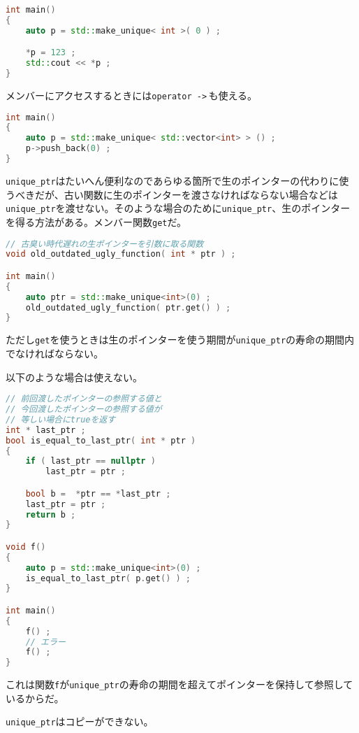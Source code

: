 \begin{lstlisting}[language={C++}]
int main()
{
    auto p = std::make_unique< int >( 0 ) ;

    *p = 123 ;
    std::cout << *p ;
}
\end{lstlisting}

メンバーにアクセスするときには\texttt{operator ->}\,も使える。

\begin{lstlisting}[language={C++}]
int main()
{
    auto p = std::make_unique< std::vector<int> > () ;
    p->push_back(0) ;
}
\end{lstlisting}

\texttt{unique\_ptr}はたいへん便利なのであらゆる箇所で生のポインターの代わりに使うべきだが、古い関数に生のポインターを渡さなければならない場合などは\texttt{unique\_ptr}を渡せない。そのような場合のために\texttt{unique\_ptr}、生のポインターを得る方法がある。メンバー関数\texttt{get}だ。

\ifTombow\pagebreak\fi
\begin{lstlisting}[language={C++}]
// 古臭い時代遅れの生ポインターを引数に取る関数
void old_outdated_ugly_function( int * ptr ) ;

int main()
{
    auto ptr = std::make_unique<int>(0) ;
    old_outdated_ugly_function( ptr.get() ) ;
}
\end{lstlisting}

ただし\texttt{get}を使うときは生のポインターを使う期間が\texttt{unique\_ptr}の寿命の期間内でなければならない。

以下のような場合は使えない。

\begin{lstlisting}[language={C++}]
// 前回渡したポインターの参照する値と
// 今回渡したポインターの参照する値が
// 等しい場合にtrueを返す
int * last_ptr ;
bool is_equal_to_last_ptr( int * ptr )
{
    if ( last_ptr == nullptr )
        last_ptr = ptr ;

    bool b =  *ptr == *last_ptr ;
    last_ptr = ptr ;
    return b ;
}

void f()
{
    auto p = std::make_unique<int>(0) ;
    is_equal_to_last_ptr( p.get() ) ;
}

int main()
{
    f() ;
    // エラー
    f() ; 
}
\end{lstlisting}

これは関数\texttt{f}が\texttt{unique\_ptr}の寿命の期間を超えてポインターを保持して参照しているからだ。

\texttt{unique\_ptr}はコピーができない。

